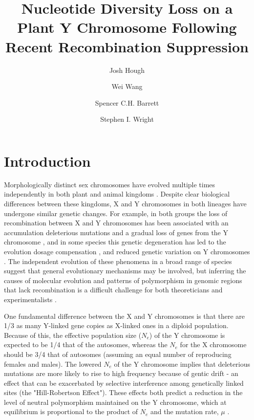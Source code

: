 \documentclass[9pt,twocolumn,twoside]{gsajnl}
\title{Nucleotide Diversity Loss on a Plant Y Chromosome Following Recent Recombination Suppression}
\author[$\ast$,$\dagger$,1]{Josh Hough}
\author[$\dagger$]{Wei Wang}
\author[$\dagger$]{Spencer C.H. Barrett}
\author[$\dagger$]{Stephen I. Wright}
\affil[$\ast$]{Department of Plant Sciences, University of California, Davis}
\affil[$\dagger$]{Department of Ecology and Evolutionary Biology, University of Toronto}
\begin{document}
\maketitle
\thispagestyle{firststyle}
\marginmark
\firstpagefootnote
{}
\vspace{-11pt}

\section*{Introduction}

\lettrine[lines=2]{\color{color2}M}{}orphologically distinct sex chromosomes have evolved multiple times independently in both plant and animal kingdoms \citep{westergaard1958,ohno1967,bull1983,charlesworth1991}. Despite clear biological differences between these kingdoms, X and Y chromosomes in both lineages have undergone similar genetic changes. For example, in both groups the loss of recombination between X and Y chromosomes has been associated with an accumulation deleterious mutations and a gradual loss of genes from the Y chromosome \citep{hough2014,bergero2015,bachtrog2013NRG}, and in some species this genetic degeneration has led to the evolution dosage compensation \citep{charlesworth1996CB,muyle2012,mank2013sex,papadopulos2015}, and reduced genetic variation on Y chromosomes \citep{qiu2010nucleotide, ellegren2011,bachtrog2013NRG}. The independent evolution of these phenomena in a broad range of species suggest that general evolutionary mechanisms may be involved, but inferring the causes of molecular evolution and patterns of polymorphism in genomic regions that lack recombination is a difficult challenge for both theoreticians and experimentalists \citep{charlesworth1978,feldman1980evolution,barton1995general,charlesworth1996CB,otto1997deleterious,charlesworth2000degeneration,mcvean2000effects}.

One fundamental difference between the X and Y chromosomes is that there are 1/3 as many Y-linked gene copies as X-linked ones in a diploid population. Because of this, the effective population size ($N_{e}$) of the Y chromosome is expected to be 1/4 that of the autosomes, whereas the $N_{e}$ for the X chromosome should be 3/4 that of autosomes (assuming an equal number of reproducing females and males). The lowered $N_{e}$ of the Y chromosome implies that deleterious mutations are more likely to rise to high frequency because of gentic drift \citep{nei1981genetic} - an effect that can be exacerbated by selective interference among genetically linked sites (the "Hill-Robertson Effect"). These effects both predict a reduction in the level of neutral polymorphism maintained on the Y chromosome, which at equilibrium is proportional to the product of $N_{e}$ and the mutation rate, $\mu$ \citep{Kimura1984,charlesworth1987}.
\end{document}
